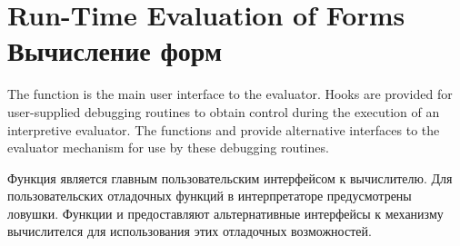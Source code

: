 \section{Run-Time Evaluation of Forms Вычисление форм}

The function  is the main user interface to the evaluator.
Hooks are provided for user-supplied debugging routines
to obtain control during the execution of an interpretive evaluator.
The functions  and  provide alternative
interfaces to the evaluator mechanism for use by these debugging routines.

Функция  является главным пользовательским интерфейсом к вычислителю.
Для пользовательских отладочных функций в интерпретаторе предусмотрены ловушки. 
Функции  и  предоставляют альтернативные интерфейсы
к механизму вычислителся для использования этих отладочных возможностей.

